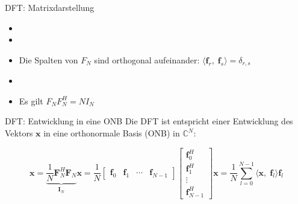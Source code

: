 \documentclass[14pt, aspectratio=169, handout]{beamer}
\begin{document}
\begin{frame}{DFT: Matrixdarstellung}
    

\begin{itemize}
    \item[] 
    \item[] 
    \item[] Die Spalten von $F_N$ sind orthogonal aufeinander: $\langle \mathbf{f}_r, \; \mathbf{f}_s \rangle = \delta_{r,s}$
    \item[] 
    \item[] Es gilt $F_N F_N^H = N I_N$
\end{itemize}
\end{frame}

\begin{frame}{DFT: Entwicklung in eine ONB}
    Die DFT ist entspricht einer Entwicklung des Vektors $\mathbf{x}$ in eine orthonormale Basis (ONB) in $\mathbb{C}^N$:

$$\mathbf{x} = \underbrace{\frac{1}{N} \mathbf{F}_N^H \mathbf{F}_N}_{\mathbf{I}_N} \mathbf{x} = \frac{1}{N} \begin{bmatrix}
    \mathbf{f}_0 & \mathbf{f}_1 & \cdots & \mathbf{f}_{N-1}
\end{bmatrix} \begin{bmatrix}
    \mathbf{f}_0^H \\
    \mathbf{f}_1^H \\
    \vdots \\
    \mathbf{f}_{N-1}^H
\end{bmatrix} \mathbf{x} = \frac{1}{N} \sum_{l=0}^{N-1} \langle \mathbf{x}, \; \mathbf{f}_l \rangle \mathbf{f}_l$$
\end{frame}
\end{document}
